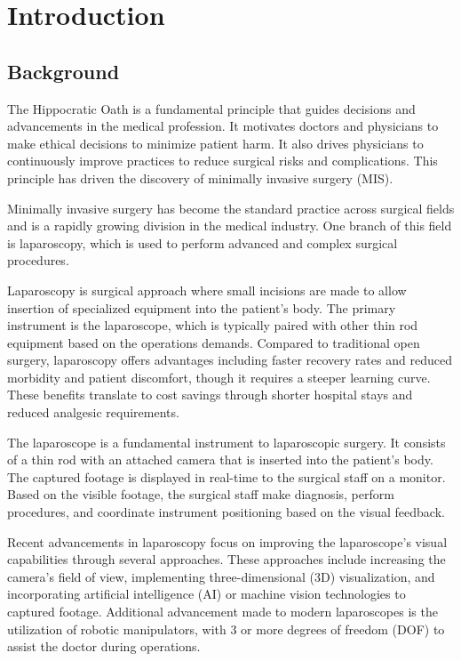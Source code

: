 \chapter{Introduction}

\section{Background}
\label{sec:Background}

The Hippocratic Oath is a fundamental principle that guides decisions and advancements in the medical profession. It motivates doctors and physicians to make ethical decisions to minimize patient harm. It also drives physicians to continuously improve practices to reduce surgical risks and complications. This principle has driven the discovery of minimally invasive surgery (MIS). \citep{FIS-2021}


Minimally invasive surgery has become the standard practice across surgical fields and is a rapidly growing division in the medical industry. One branch of this field is laparoscopy, which is used to perform advanced and complex surgical procedures. \citep{FIS-2021}

Laparoscopy is surgical approach where small incisions are made to allow insertion of specialized equipment into the patient’s body. The primary instrument is the laparoscope, which is typically paired with other thin rod equipment based on the operations demands.  Compared to traditional open surgery, laparoscopy offers advantages including faster recovery rates and reduced morbidity and patient discomfort, though it requires a steeper learning curve. These benefits translate to cost savings through shorter hospital stays and reduced analgesic requirements. \citep{AIP-2018}


The laparoscope is a fundamental instrument to laparoscopic surgery. It consists of a thin rod with an attached camera that is inserted into the patient’s body. The captured footage is displayed in real-time to the surgical staff on a monitor. Based on the visible footage, the surgical staff make diagnosis, perform procedures, and coordinate instrument positioning based on the visual feedback. \citep{FIS-2021}


Recent advancements in laparoscopy focus on improving the laparoscope’s visual capabilities through several approaches. These approaches include increasing the camera’s field of view, implementing three-dimensional (3D) visualization, and incorporating artificial intelligence (AI) or machine vision technologies to captured footage. Additional advancement made to modern laparoscopes is the utilization of robotic manipulators, with 3 or more degrees of freedom (DOF) to assist the doctor during operations. \citep{AIP-2018}


